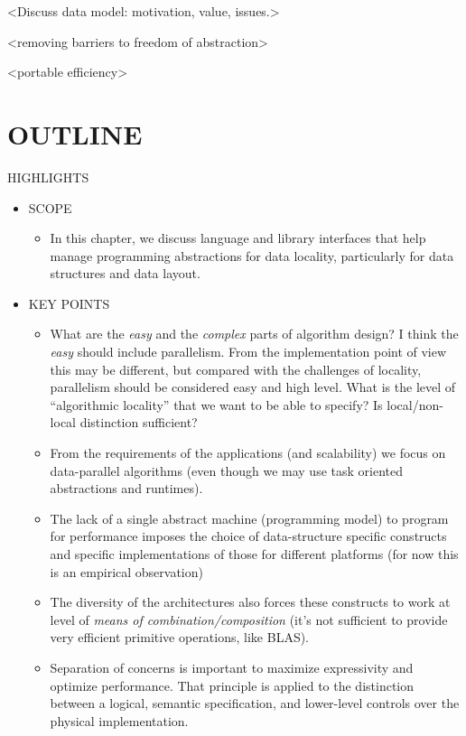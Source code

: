 \begin{itemize}
<Discuss data model: motivation, value, issues.>

<removing barriers to freedom of abstraction>

<portable efficiency>

\section{OUTLINE}

HIGHLIGHTS

\begin{itemize}
\item SCOPE
  \begin{itemize}
  \item In this chapter, we discuss language and library interfaces that help manage programming abstractions for data locality, particularly for data structures and data layout. 
  \end{itemize}
\item KEY POINTS
  \begin{itemize}
  \item {}What are the {\em easy} and the {\em complex} parts of algorithm design? I think the {\em easy} should include parallelism. From the implementation point of view this may be different, but compared with the challenges of locality, parallelism should be considered easy and high level. What is the level of ``algorithmic locality'' that we want to be able to specify? Is local/non-local distinction sufficient?
  \item From the requirements of the applications (and scalability) we focus on data-parallel algorithms (even though we may use task oriented abstractions and runtimes).
  \item The lack of a single abstract machine (programming model) to program for performance imposes the choice of data-structure specific constructs and specific implementations of those for different platforms (for now this is an empirical observation)
  \item {}The diversity of the architectures also forces these constructs to work at level of {\em means of combination/composition} (it's not sufficient to provide very efficient primitive operations, like BLAS).
  \item Separation of concerns is important to maximize expressivity and optimize performance.  That principle is applied to the distinction between a logical, semantic specification, and lower-level controls over the physical implementation.

\end{itemize}
\end{itemize}
\end{itemize}
